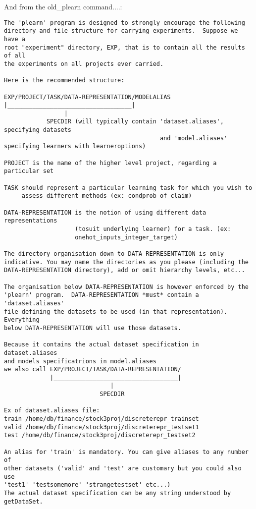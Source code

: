 \documentclass[11pt]{book}
\begin{document}
And from the old\_plearn command....:

\begin{verbatim}
The 'plearn' program is designed to strongly encourage the following
directory and file structure for carrying experiments.  Suppose we have a
root "experiment" directory, EXP, that is to contain all the results of all
the experiments on all projects ever carried.

Here is the recommended structure:

EXP/PROJECT/TASK/DATA-REPRESENTATION/MODELALIAS
|___________________________________|
                 |
            SPECDIR (will typically contain 'dataset.aliases', specifying datasets 
                                            and 'model.aliases' specifying learners with learneroptions)

PROJECT is the name of the higher level project, regarding a particular set

TASK should represent a particular learning task for which you wish to
     assess different methods (ex: condprob_of_claim)

DATA-REPRESENTATION is the notion of using different data representations
                    (tosuit underlying learner) for a task. (ex:
                    onehot_inputs_integer_target)

The directory organisation down to DATA-REPRESENTATION is only
indicative. You may name the directories as you please (including the
DATA-REPRESENTATION directory), add or omit hierarchy levels, etc...

The organisation below DATA-REPRESENTATION is however enforced by the
'plearn' program.  DATA-REPRESENTATION *must* contain a 'dataset.aliases'
file defining the datasets to be used (in that representation). Everything
below DATA-REPRESENTATION will use those datasets. 

Because it contains the actual dataset specification in dataset.aliases 
and models specificatrions in model.aliases
we also call EXP/PROJECT/TASK/DATA-REPRESENTATION/
             |___________________________________|
                              |
                           SPECDIR

Ex of dataset.aliases file:
train /home/db/finance/stock3proj/discreterepr_trainset
valid /home/db/finance/stock3proj/discreterepr_testset1
test /home/db/finance/stock3proj/discreterepr_testset2

An alias for 'train' is mandatory. You can give aliases to any number of
other datasets ('valid' and 'test' are customary but you could also use
'test1' 'testsomemore' 'strangetestset' etc...)
The actual dataset specification can be any string understood by getDataSet.



\end{verbatim}
\end{document}
